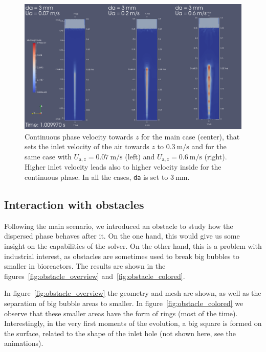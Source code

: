 \documentclass[11pt, a4paper, twoside]{article}
\begin{document}
\begin{figure}
    \centering
    \includegraphics[width=\textwidth]{figures/main/Ua_comparison_Ubz}
    \caption{Continuous phase velocity towards $z$ for the main case (center), that sets the inlet velocity of the air towards $z$ to $\SI{0.3}{\metre/\second}$ and for the same case with $U_{\mathrm{a},z}=\SI{0.07}{\metre/\second}$ (left) and $U_{\mathrm{a},z}=\SI{0.6}{\metre/\second}$ (right). Higher inlet velocity leads also to higher velocity inside for the continuous phase. In all the cases, \texttt{da} is set to $\SI{3}{\milli\metre}$.}
    \label{fig:main_Ua_comparison_Ubz}
\end{figure}

\subsection{Interaction with obstacles}
Following the main scenario, we introduced an obstacle to study how the dispersed phase behaves after it. On the one hand, this would give us some insight on the capabilities of the solver. On the other hand, this is a problem with industrial interest, as obstacles are sometimes used to break big bubbles to smaller in bioreactors. The results are shown in the figures~\ref{fig:obstacle_overview} and~\ref{fig:obstacle_colored}.

In figure~\ref{fig:obstacle_overview} the geometry and mesh are shown, as well as the separation of big bubble areas to smaller. In figure~\ref{fig:obstacle_colored} we observe that these smaller areas have the form of rings (most of the time). Interestingly, in the very first moments of the evolution, a big square is formed on the surface, related to the shape of the inlet hole (not shown here, see the animations).
\end{document}

